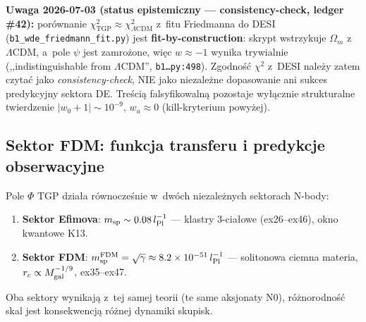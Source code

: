 \begin{remark}
\medskip\noindent
\textbf{Uwaga 2026-07-03 (status epistemiczny --- consistency-check,
ledger \#42):} por\'ownanie $\chi^2_{\mathrm{TGP}} \approx
\chi^2_{\Lambda\mathrm{CDM}}$ z~fitu Friedmanna do DESI
(\texttt{b1\_wde\_friedmann\_fit.py}) jest \textbf{fit-by-construction}:
skrypt wstrzykuje $\Omega_m$ z~$\Lambda$CDM, a~pole $\psi$ jest
zamro\.zone, wi\k{e}c $w \approx -1$ wynika trywialnie
(,,indistinguishable from $\Lambda$CDM'', \texttt{b1\ldots py:498}).
Zgodno\'s\'c $\chi^2$ z~DESI nale\.zy zatem czyta\'c jako
\emph{consistency-check}, NIE jako niezale\.zne dopasowanie ani
sukces predykcyjny sektora DE. Tre\'sci\k{a} falsyfikowaln\k{a}
pozostaje wy\l{}\k{a}cznie strukturalne twierdzenie
$|w_0+1| \sim 10^{-9}$, $w_a \approx 0$ (kill-kryterium powy\.zej).
\end{remark}

\subsection{Sektor FDM: funkcja transferu i predykcje obserwacyjne}
\label{ssec:fdm-transfer}

\begin{remark}\label{rem:fdm-tgp-sector}
Pole $\Phi$ TGP dzia\l{}a r\'ownocze\'snie w~dw\'och niezale\.znych
sektorach N-body:
\begin{enumerate}
  \item \textbf{Sektor Efimova}: $m_{\rm sp} \sim 0.08\,l_{\rm Pl}^{-1}$ ---
    klastry 3-cia\l{}owe (ex26--ex46), okno kwantowe K13.
  \item \textbf{Sektor FDM}: $m_{\rm sp}^{\rm FDM} = \sqrt{\gamma}
    \approx 8.2\times10^{-51}\,l_{\rm Pl}^{-1}$ --- solitonowa ciemna
    materia, $r_c \propto M_{\rm gal}^{-1/9}$, ex35--ex47.
\end{enumerate}
Oba sektory wynikaj\k{a} z~tej samej teorii (te same aksjonaty N0),
r\'o\.znorodno\'s\'c skal jest konsekwencj\k{a} r\'o\.znej dynamiki
skupisk.
\end{remark}

